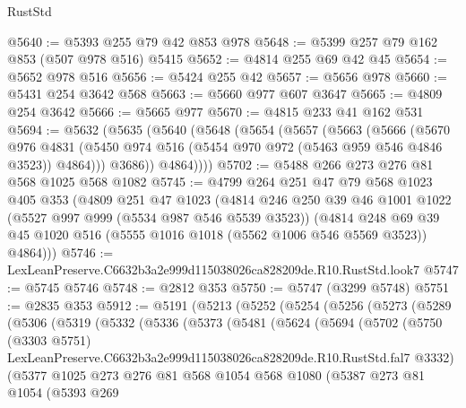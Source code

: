 \begin{lexlean}{RustStd}
\begin{coremodule}
@5640 := @5393 @255 @79 @42 @853 @978
@5648 := @5399 @257 @79 @162 @853 (@507 @978 @516) @5415
@5652 := @4814 @255 @69 @42 @45
@5654 := @5652 @978 @516
@5656 := @5424 @255 @42
@5657 := @5656 @978
@5660 := @5431 @254 @3642 @568
@5663 := @5660 @977 @607 @3647
@5665 := @4809 @254 @3642
@5666 := @5665 @977
@5670 := @4815 @233 @41 @162 @531
@5694 := @5632
    (@5635
      (@5640
        (@5648
          (@5654
            (@5657
              (@5663
                (@5666
                  (@5670
                    @976
                    @4831
                    (@5450 @974 @516 (@5454 @970 @972 (@5463 @959 @546 @4846 @3523)) @4864)))
                @3686))
            @4864))))
@5702 := @5488 @266 @273 @276 @81 @568 @1025 @568 @1082
@5745 := @4799
    @264
    @251
    @47
    @79
    @568
    @1023
    @405
    @353
    (@4809
      @251
      @47
      @1023
      (@4814
        @246
        @250
        @39
        @46
        @1001
        @1022
        (@5527 @997 @999 (@5534 @987 @546 @5539 @3523))
        (@4814
          @248
          @69
          @39
          @45
          @1020
          @516
          (@5555 @1016 @1018 (@5562 @1006 @546 @5569 @3523))
          @4864)))
@5746 := LexLeanPreserve.C6632b3a2e999d115038026ca828209de.R10.RustStd.look7
@5747 := @5745 @5746
@5748 := @2812 @353
@5750 := @5747 (@3299 @5748)
@5751 := @2835 @353
@5912 := @5191
    (@5213
      (@5252
        (@5254
          (@5256
            (@5273
              (@5289
                (@5306
                  (@5319
                    (@5332
                      (@5336
                        (@5373
                          (@5481
                            (@5624
                              (@5694
                                (@5702
                                  (@5750
                                    (@3303 @5751)
                                    LexLeanPreserve.C6632b3a2e999d115038026ca828209de.R10.RustStd.fal7
                                    @3332)
                                  (@5377
                                    @1025
                                    @273
                                    @276
                                    @81
                                    @568
                                    @1054
                                    @568
                                    @1080
                                    (@5387
                                      @273
                                      @81
                                      @1054
                                      (@5393
                                        @269

\end{coremodule}
\end{lexlean}
